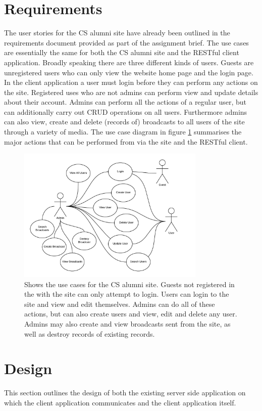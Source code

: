 \documentclass[paper=a4, fontsize=11pt]{scrartcl}	%
\numberwithin{equation}{section}															%
\numberwithin{figure}{section}																%
\numberwithin{table}{section}
\begin{document}
\section{Requirements}
\label{sec:requirements}
The user stories for the CS alumni site have already been outlined in the requirements document provided as part of the assignment brief. The use cases are essentially the same for both the CS alumni site and the RESTful client application. Broadly speaking there are three different kinds of users. Guests are unregistered users who can only view the website home page and the login page. In the client application a user must login before they can perform any actions on the site. Registered uses who are not admins can perform view and update details about their account. Admins can perform all the actions of a regular user, but can additionally carry out CRUD operations on all users. Furthermore admins can also view, create and delete (records of) broadcasts to all users of the site through a variety of media. The use case diagram in figure \ref{fig:use-cases} summarises the major actions that can be performed from via the site and the RESTful client.

\begin{figure}[H]
\centering
\includegraphics[width=0.8\textwidth]{img/use_cases.png}
\caption{Shows the use cases for the CS alumni site. Guests not registered in the with the site can only attempt to login. Users can login to the site and view and edit themselves. Admins can do all of these actions, but can also create users and view, edit and delete any user. Admins may also create and view broadcasts sent from the site, as well as destroy records of existing records.}
\label{fig:use-cases}
\end{figure}

\section{Design}
\label{sec:design}
This section outlines the design of both the existing server side application on which the client application communicates and the client application itself.
\end{document}
